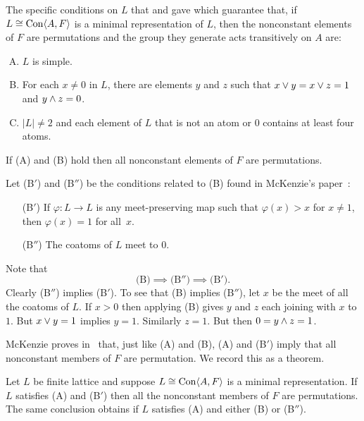 \begin{comment}
\end{comment}




The specific conditions on $L$ that 
\Palfy and \Pudlak gave which guarantee 
that, if $L \cong \operatorname{Con} \langle A,F\rangle$ is a minimal representation of $L$,
then the nonconstant elements of $F$ are 
permutations and the group they generate acts transitively on $A$ are:
\begin{enumerate}[(A)]
\item $L$ is simple.
\item For each $x \ne 0$ in $L$, there are elements $y$ and $z$
such that $x \vee y = x \vee z = 1$ and $y\wedge z = 0$.
\item $|L|\ne 2$ and each element of $L$ that is not an atom or $0$ contains at
least four atoms.
\end{enumerate}
If (A) and (B) hold then all nonconstant elements of $F$ are permutations.

Let (B$'$) and (B$''$) be the conditions related to (B) found in McKenzie's
paper~\cite{McKenzie1983}:
\begin{enumerate}
\item[(B$'$)]
If $\varphi: L \to L$ is any meet-preserving map such that $\varphi(x) > x$ for
$x\ne 1$, then $\varphi(x) = 1$ for all~$x$.
\item[(B$''$)]
The coatoms of $L$ meet to $0$.
\end{enumerate}
Note that
\[
\text{(B)} \implies \text{(B$''$)}  \implies \text{(B$'$)}.
\]
Clearly (B$''$) implies (B$'$). To see that (B) implies (B$''$),
let $x$ be the meet of all the coatoms of $L$. If $x > 0$
then applying (B) gives $y$ and $z$ each joining with $x$ to $1$.
But $x\vee y = 1$ implies $y = 1$. Similarly $z = 1$. But then
$0 = y \wedge z = 1$.


McKenzie proves in~\cite{McKenzie1983} that, just like (A) and (B),
(A) and (B$'$) imply that all nonconstant members of $F$ are
permutation. We record this as a theorem.

\begin{theorem}
Let $L$ be finite lattice and suppose $L \cong \operatorname{Con} \langle A,F\rangle$
is a minimal representation. If $L$ satisfies \textup{(A)} and
\textup{(B$'$)} then
all the nonconstant members of $F$ are permutations. 
The same conclusion obtains if 
$L$ satisfies \textup{(A)} and either \textup{(B)} or
\textup{(B$''$)}.
\end{theorem}

